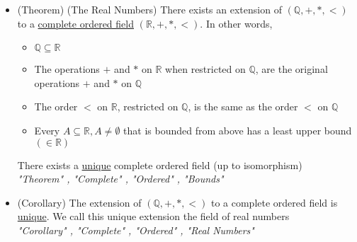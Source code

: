 \documentclass{article}
\begin{document}
\begin{itemize}
    \item (Theorem) (The Real Numbers) There exists an extension of $(\mathbb{Q},+,*,<)$ to a \underline{complete ordered field}
    $(\mathbb{R},+,*,<)$.
    In other words,
    \begin{itemize}
        \item $\mathbb{Q} \subseteq \mathbb{R}$
        \item The operations $+$ and $*$ on $\mathbb{R}$ when restricted on $\mathbb{Q}$, are the original operations $+$ and $*$ on $\mathbb{Q}$
        \item The order $<$ on $\mathbb{R}$, restricted on $\mathbb{Q}$, is the same as the order $<$ on $\mathbb{Q}$
        \item Every $A \subseteq \mathbb{R}, A \neq \emptyset$ that is bounded from above has a least upper bound $(\in \mathbb{R})$
    \end{itemize}
    There exists a \underline{unique} complete ordered field (up to isomorphism) \\
    \vspace{.25cm} \textit{"Theorem" , "Complete" , "Ordered" , "Bounds"}
    
    \item (Corollary) The extension of $(\mathbb{Q},+,*,<)$ to a complete ordered field is \underline{unique}. We call this unique extension the field of real numbers \\
    \vspace{.25cm} \textit{"Corollary" , "Complete" , "Ordered" , "Real Numbers"}
    
\end{itemize}
\end{document}
